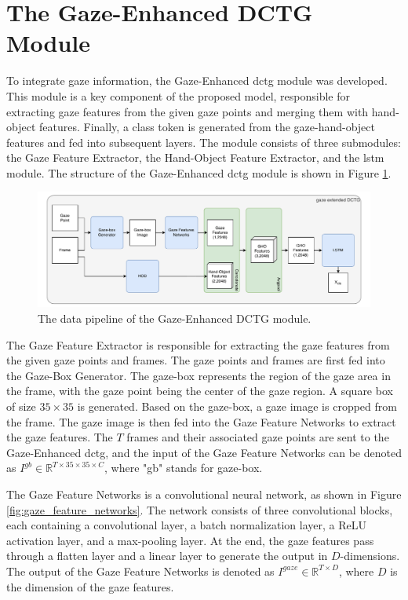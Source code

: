 \section{The Gaze-Enhanced DCTG Module}
\label{sec:Gaze-Enhanced DCTG Module}
To integrate gaze information, the Gaze-Enhanced \gls{dctg} module was developed. This module is a key component of the proposed model, responsible for extracting gaze features from the given gaze points and merging them with hand-object features. Finally, a class token is generated from the gaze-hand-object features and fed into subsequent layers. The module consists of three submodules: the Gaze Feature Extractor, the Hand-Object Feature Extractor, and the \gls{lstm} module. The structure of the Gaze-Enhanced \gls{dctg} module is shown in Figure \ref{fig:gaze_dctg}.
\begin{figure}
    \centering
    \includegraphics[width=\textwidth]{graphics/dctg.pdf}
    \caption{The data pipeline of the Gaze-Enhanced DCTG module.}
    \label{fig:gaze_dctg}
\end{figure}

The Gaze Feature Extractor is responsible for extracting the gaze features from the given gaze points and frames. The gaze points and frames are first fed into the Gaze-Box Generator. The gaze-box represents the region of the gaze area in the frame, with the gaze point being the center of the gaze region. A square box of size $35 \times 35$ is generated. Based on the gaze-box, a gaze image is cropped from the frame. The gaze image is then fed into the Gaze Feature Networks to extract the gaze features. The $T$ frames and their associated gaze points are sent to the Gaze-Enhanced \gls{dctg}, and the input of the Gaze Feature Networks can be denoted as $I^{gb} \in \mathbb{R}^{T \times 35 \times 35 \times C}$,  where "gb" stands for gaze-box.

The Gaze Feature Networks is a convolutional neural network, as shown in Figure \ref{fig:gaze_feature_networks}. The network consists of three convolutional blocks, each containing a convolutional layer, a batch normalization layer, a ReLU activation layer, and a max-pooling layer.  At the end, the gaze features pass through a flatten layer and a linear layer to generate the output in $D$-dimensions. The output of the Gaze Feature Networks is denoted as $I^{gaze} \in \mathbb{R}^{T \times D}$, where $D$ is the dimension of the gaze features.

